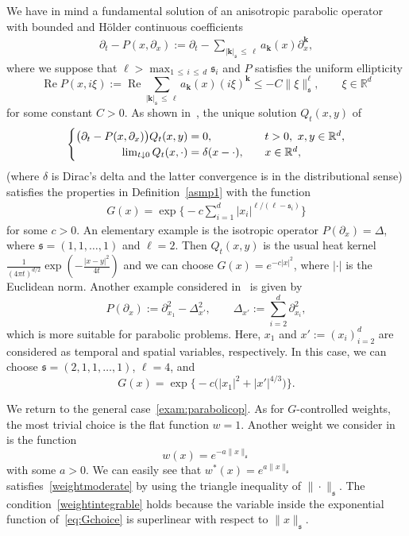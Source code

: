 \documentclass[AHL,Unicode,longabstracts,published]{cedram}
\makeatletter
\newcommand{\bbR}{\mathbb{R}}
\newcommand{\mfs}{\mathfrak{s}}
\newcommand{\wco}{w^*}
\newcommand{\bfk}{\mathbf{k}}
\DeclareMathOperator{\Rre}{Re}
\newenvironment{alcases}{\left\{\begingroup\arraycolsep=0pt\renewcommand{\arraystretch}{1.2}\begin{array}{r@{\;}l@{\quad}l}}{\end{array}\endgroup\right.}
\makeatother
\begin{document}
\begin{exam}\label{exam:FS}
We have in mind a fundamental solution of an anisotropic parabolic operator with bounded and H\"older continuous coefficients
\begin{align}\label{exam:parabolicop}
\partial_t-P(x,\partial_x):=\partial_t-\sum_{|{\bfk}|_\mfs\,\le\,\ell}a_{\bfk}(x)\partial_x^{\bfk},
\end{align}
where we suppose that $\ell>\max_{1\,\le\,i\,\le\,d}\mfs_i$ and $P$ satisfies the uniform ellipticity
\[
\Rre P(x,i\xi):=
\Rre\sum_{|{\bfk}|_\mfs\,\le\,\ell}a_{\bfk}(x)(i\xi)^{\bfk}\le-C\|\xi\|_\mfs^\ell,\qquad\xi\in\bbR^d
\]
for some constant $C>0$. As shown in~\cite[Appendix~A]{BHK22}, the unique solution $Q_t(x,y)$ of
\[
\begin{alcases}
\big(\partial_t-P(x,\partial_x)\big)Q_t(x,y)&=0,&t>0,\ x,y\in\bbR^d,\\
\lim_{t\downarrow0}Q_t(x,\cdot)&=\delta(x-\cdot),\quad&x\in\bbR^d,
\end{alcases}
\]
(where $\delta$ is Dirac's delta and the latter convergence is in the distributional sense) satisfies the properties in Definition~\ref{asmp1} with the function
\begin{align}\label{eq:Gchoice}
G(x)=\exp\bigg\{-c\sum_{i=1}^d|x_i|^{\ell/(\ell-\mfs_i)}\bigg\}
\end{align}
for some $c>0$. An elementary example is the isotropic operator $P(\partial_x)=\Delta$, where $\mfs=(1,1,\dots,1)$ and $\ell=2$. Then $Q_t(x,y)$ is the usual heat kernel $\frac1{(4\pi t)^{d/2}}\exp(-\frac{|x-y|^2}{4t})$ and we can choose $G(x)=e^{-c|x|^2}$, where $|\cdot|$ is the Euclidean norm. Another example considered in~\cite{OW19, BH20} is given by
\[
P(\partial_x):=\partial_{x_1}^2-\Delta_{x'}^2,\qquad\Delta_{x'}:=\sum_{i=2}^d\partial_{x_i}^2,
\]
which is more suitable for parabolic problems. Here, $x_1$ and $x':=(x_i)_{i=2}^d$ are considered as temporal and spatial variables, respectively. In this case, we can choose $\mfs=(2,1,1,\dots,1)$, $\ell=4$, and
\[
G(x)=\exp\big\{-c\big(|x_1|^2+|x'|^{4/3}\big)\big\}.
\]

We return to the general case~\eqref{exam:parabolicop}. As for $G$-controlled weights, the most trivial choice is the flat function $w=1$. Another weight we consider in~\cite{BPHZ} is the function
\[
w(x)=e^{-a\|x\|_{\mfs}}
\]
with some $a>0$. We can easily see that $\wco(x)=e^{a\|x\|_{\mfs}}$ satisfies~\eqref{weightmoderate} by using the triangle inequality of $\|\cdot\|_\mfs$. The condition~\eqref{weightintegrable} holds because the variable inside the exponential function of~\eqref{eq:Gchoice} is superlinear with respect to $\|x\|_\mfs$.
\end{exam}
\end{document}
